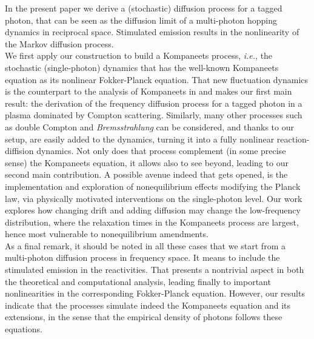 \documentclass[a4paper,12pt,reqno,superscriptaddress,nofootinbib]{revtex4}
\newcommand{\0}{^{(0)}}
\newcommand{\1}{^{(1)}}
\newcommand{\2}{^{(2)}}
\begin{document}
In the present paper  we derive a (stochastic) diffusion process for a tagged photon, that can be seen as the diffusion limit of a multi-photon hopping dynamics in reciprocal space.  Stimulated emission results in the nonlinearity of the Markov diffusion process.\\ 
  We first apply our construction to build a Kompaneets process, {\it i.e.}, the stochastic (single-photon) dynamics that has the well-known Kompaneets equation as its nonlinear Fokker-Planck equation.
That new fluctuation dynamics  is the counterpart to the analysis of Kompaneets in \cite{kompa} and makes our first main result: the derivation of the frequency diffusion process for a tagged photon in a plasma dominated by Compton scattering.  Similarly, many other processes such as double Compton and  \textit{Bremsstrahlung} can be considered, and thanks to our setup, are easily added to the dynamics, turning it into a fully nonlinear reaction-diffision dynamics.  Not only does that process complement (in some precise sense) the Kompaneets equation, it allows also to see beyond, leading to our second main contribution.  A possible avenue indeed that gets opened, is the implementation and exploration of nonequilibrium effects modifying the Planck law, via physically motivated interventions on the single-photon level. Our work explores how changing drift and adding diffusion may change the low-frequency distribution, where the relaxation times in the Kompaneets process are largest, hence most vulnerable to nonequilibrium amendments.\\
As a final remark, it should be noted in all these cases that we start from a multi-photon diffusion process in frequency space.  It means to include the stimulated emission in the reactivities. That presents a nontrivial aspect in both the theoretical and computational analysis, leading finally to important nonlinearities in the corresponding Fokker-Planck equation. However, our results indicate that the processes simulate indeed the Kompaneets equation and its extensions, in the sense that the empirical density of photons follows these equations.\\
\end{document}
